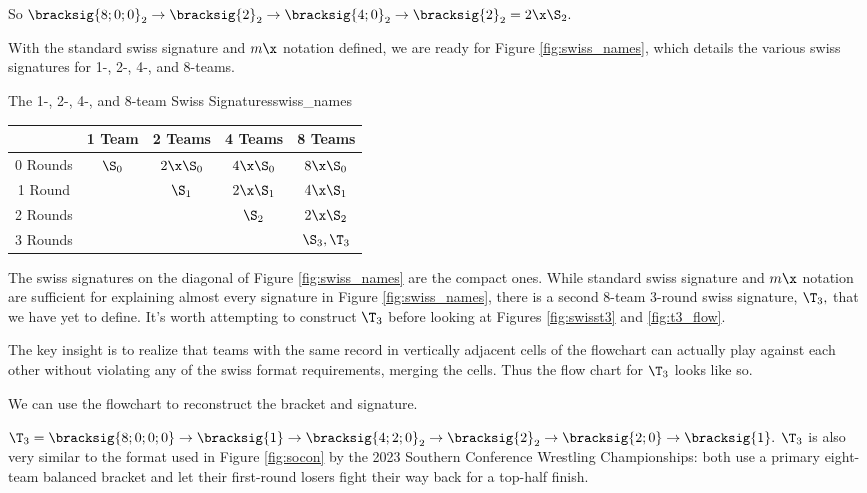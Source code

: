 {    So $\bracksig{8;0;0}_2 \to \bracksig{2}_2 \to \bracksig{4;0}_2 \to \bracksig{2}_2 = 2\x\S_2.$

    With the standard swiss signature and $m\x$ notation defined, we are ready for Figure \ref{fig:swiss_names}, which details the various swiss signatures for 1-, 2-, 4-, and 8-teams.

    \begin{figg}{The 1-, 2-, 4-, and 8-team Swiss Signatures}{swiss_names}
        \begin{center}
            \begin{tabular}{ c | c | c | c | c}
                & 1 Team & 2 Teams & 4 Teams & 8 Teams\\
                \hline
                0 Rounds & $\S_0$ & $2\x\S_0$ & $4\x\S_0$ & $8\x\S_0$\\
                \hline
                1 Round & & $\S_1$ & $2\x\S_1$ & $4\x\S_1$\\
                \hline
                2 Rounds & & & $\S_2$ & $2\x\S_2$\\
                \hline
                \multirow{1}{*}{3 Rounds} & & & &  $\S_3, \T_3$ \\
            \end{tabular}
        \end{center}
        \end{figg}

    The swiss signatures on the diagonal of Figure \ref{fig:swiss_names} are the compact ones. While standard swiss signature and $m\x$ notation are sufficient for explaining almost every signature in Figure \ref{fig:swiss_names}, there is a second 8-team 3-round swiss signature, $\T_3,$ that we have yet to define. It's worth attempting to construct $\T_3$ before looking at Figures \ref{fig:swisst3} and \ref{fig:t3_flow}.

    The key insight is to realize that teams with the same record in vertically adjacent cells of the flowchart can actually play against each other without violating any of the swiss format requirements, merging the cells. Thus the flow chart for $\T_3$ looks like so.


    We can use the flowchart to reconstruct the bracket and signature.


    $\T_3 = \bracksig{8;0;0;0} \to \bracksig{1} \to \bracksig{4;2;0}_2 \to \bracksig{2}_2 \to \bracksig{2;0} \to \bracksig{1}.$ $\T_3$ is also very similar to the format used in Figure \ref{fig:socon} by the 2023 Southern Conference Wrestling Championships: both use a primary eight-team balanced bracket and let their first-round losers fight their way back for a top-half finish.

}
